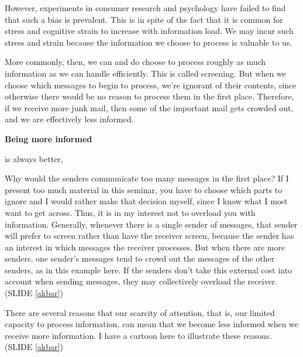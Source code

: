 \documentclass[%
  slidesonly,%
  semlayer%
  ]{seminar}                                  %
\newcommand{\sref}[1]{SLIDE \ref{#1}}
\begin{document}
However, experiments in consumer research and psychology have failed to find
that such a bias is prevalent. This is in spite of the fact that it is common
for stress and cognitive strain to increase with information load. We may
incur such stress and strain because the information we choose to process is
valuable to us.

More commonly, then, we can and do choose to process roughly as much
information as we can handle efficiently. This is called screening. But when
we choose which messages to begin to process, we're ignorant of their
contents, since otherwise there would be no reason to process them in the
first place. Therefore, if we receive more junk mail, then some of the
important mail gets crowded out, and we are effectively less informed.

\begin{slide} \label{informed}
\begin{center}
  {\bf Being more informed} \par
    \smallskip
  is always better,\par
    \medskip
\end{center}
\end{slide}

  Why would the senders communicate too many messages in the first place? If I
present too much material in this seminar, you have to choose which parts to
ignore and I would rather make that decision myself, since I know what I most
want to get across. Thus, it is in my interest not to overload you with
information. Generally, whenever there is a single sender of messages, that
sender will prefer to screen rather than have the receiver screen, because the
sender has an interest in which messages the receiver processes.
But when there are more senders, one sender's  messages tend to crowd out the
messages of the other senders, as in this example here. If the senders don't
take this external cost into account when sending messages, they may
collectively overload the receiver. (\sref{akbar})

There are several reasons that our scarcity of attention, that is, our limited
capacity to process information, can mean that we become less informed when we
receive  more information. I have a cartoon here to illustrate these reasons.
(\sref{akbar})
\end{document}
